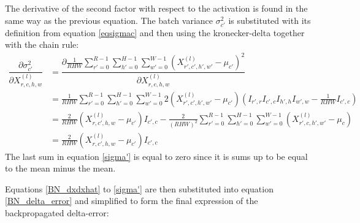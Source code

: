 \documentclass[a4paper, twoside]{article}
\newcommand*{\pd}[2]{\ensuremath{\dfrac{\partial #1}{\partial #2}}}
\begin{document}
The derivative of the second factor with respect to the activation is found in the same way as the previous equation. The batch variance $\sigma^2_{c'}$ is substituted with its definition from equation \eqref{eqsigmac} and then using the kronecker-delta together with the chain rule: \cite{webBN1} \cite{webBN2}
\begin{equation}\label{sigma'}
\begin{split}
\pd{\sigma^2_{c'}}{{X}^{(l)}_{r,c,h,w}}
	& = \pd{\frac{1}{RHW} \sum\limits^{R-1}_{r'=0} \sum\limits^{H-1}_{h'=0} \sum\limits^{W-1}_{w'=0} ({X^{(l)}_{r',c',h',w'} - \mu_{c'}})^2}{{X}^{(l)}_{r,c,h,w}} \\
	& = \frac{1}{RHW} \sum\limits^{R-1}_{r'=0} \sum\limits^{H-1}_{h'=0} \sum\limits^{W-1}_{w'=0} 2 ({X^{(l)}_{r',c',h',w'} - \mu_{c'}}) (I_{r',r} I_{c',c} I_{h',h} I_{w',w} - \frac{1}{RHW} I_{c',c}) \\
	& = \frac{2}{RHW} ({X^{(l)}_{r,c',h,w} - \mu_{c'}})I_{c',c} - \frac{2}{(RHW)^2}  \sum\limits^{R-1}_{r'=0} \sum\limits^{H-1}_{h'=0} \sum\limits^{W-1}_{w'=0} ({X^{(l)}_{r',c,h',w'} - \mu_{c}}) \\
	& = \frac{2}{RHW} ({X^{(l)}_{r,c',h,w} - \mu_{c'}})I_{c',c}
\end{split}
\end{equation}
The last sum in equation \eqref{sigma'} is equal to zero since it is sums up to be equal to the mean minus the mean.

Equations \eqref{BN_dxdxhat} to \eqref{sigma'} are then substituted into equation \eqref{BN_delta_error} and simplified to form the final expression of the backpropagated delta-error:
\end{document}
